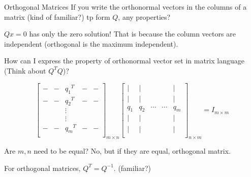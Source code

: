 \documentclass{beamer}
\begin{document}
\begin{frame}{Orthogonal Matrices}
If you write the orthonormal vectors in the columns of a matrix (kind of familiar?) tp form $Q$, any properties?

\vspace{3pt}
$Qx=0$ has only the zero solution! That is because the column vectors are independent (orthogonal is the maximum independent).

\vspace{3pt}
How can I express the property of orthonormal vector set in matrix language (Think about $Q^TQ$)?


\begin{equation*}
    \left[ \begin{matrix}
        -&		-&		{q_1}^T&		-&		-\\
        -&		-&		{q_2}^T&		-&		-\\
        &		&		\vdots&		&		\\
        &		&		\vdots&		&		\\
        -&		-&		{q_m}^T&		-&		-\\
    \end{matrix} \right] _{m\times n}\left[ \begin{matrix}
        |&		|&		&		&		|\\
        |&		|&		&		&		|\\
        q_1&		q_2&		\cdots&		\cdots&		q_m\\
        |&		|&		&		&		|\\
        |&		|&		&		&		|\\
    \end{matrix} \right] _{n\times m}=I _{m\times m}
\end{equation*}

Are $m,n$ need to be equal? No, but if they are equal, orthogonal matrix.

\vspace{3pt}
For orthogonal matrices, $Q^T=Q^{-1}$. (familiar?)
\end{frame}
\end{document}

